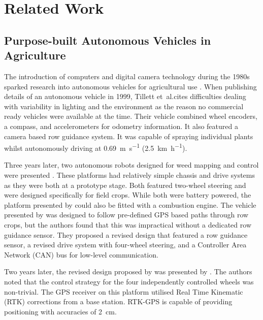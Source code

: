 \documentclass[preprint,authoryear,12pt]{elsarticle}
\begin{document}
\section{Related Work}
\label{sect:review}

    \subsection{Purpose-built Autonomous Vehicles in Agriculture}

        The introduction of computers and digital camera technology during the 1980s sparked research into autonomous vehicles for agricultural use \citep{Li2009}.
        When publishing details of an autonomous vehicle in 1999, Tillett et~al.\@ cites difficulties dealing with variability in lighting and the environment as the reason no commercial ready vehicles were available at the time.
        Their vehicle combined wheel encoders, a compass, and accelerometers for odometry information.
        It also featured a camera based row guidance system.
        It was capable of spraying individual plants whilst autonomously driving at \SI{0.69}{\meter\per\second} (\SI{2.5}{\kilo\meter\per\hour}).

        Three years later, two autonomous robots designed for weed mapping and control were presented \citep{Pedersen2002,Astrand2002}.
        These platforms had relatively simple chassis and drive systems as they were both at a prototype stage.
        Both featured two-wheel steering and were designed specifically for field crops.
        While both were battery powered, the platform presented by \cite{Astrand2002} could also be fitted with a combustion engine.
        The vehicle presented by \cite{Pedersen2002} was designed to follow pre-defined GPS based paths through row crops, but the authors found that this was impractical without a dedicated row guidance sensor.
        They proposed a revised design that featured a row guidance sensor, a revised drive system with four-wheel steering, and a Controller Area Network (CAN) bus for low-level communication.

        Two years later, the revised design proposed by \cite{Pedersen2002} was presented by \cite{Bak2004}.
        The authors noted that the control strategy for the four independently controlled wheels was non-trivial.
        The GPS receiver on this platform utilised Real Time Kinematic (RTK) corrections from a base station.
        RTK-GPS is capable of providing positioning with accuracies of \SI{2}{\centi\meter}.
\end{document}
